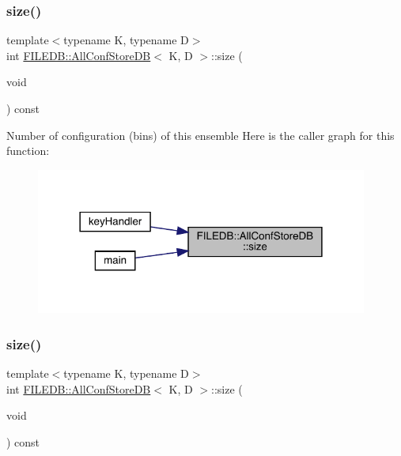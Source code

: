 \subsubsection{\texorpdfstring{size()}{size()}\hspace{0.1cm}{\footnotesize\ttfamily [1/2]}}
{\footnotesize\ttfamily template$<$typename K, typename D$>$ \\
int \mbox{\hyperlink{classFILEDB_1_1AllConfStoreDB}{F\+I\+L\+E\+D\+B\+::\+All\+Conf\+Store\+DB}}$<$ K, D $>$\+::size (\begin{DoxyParamCaption}\item[{void}]{ }\end{DoxyParamCaption}) const\hspace{0.3cm}{\ttfamily [inline]}}

Number of configuration (bins) of this ensemble Here is the caller graph for this function\+:\nopagebreak
\begin{figure}[H]
\begin{center}
\leavevmode
\includegraphics[width=309pt]{df/db6/classFILEDB_1_1AllConfStoreDB_a78dd830c5211b3b00b8eae6170ffc9d6_icgraph}
\end{center}
\end{figure}
\mbox{\label{classFILEDB_1_1AllConfStoreDB_a78dd830c5211b3b00b8eae6170ffc9d6}} 
\subsubsection{\texorpdfstring{size()}{size()}\hspace{0.1cm}{\footnotesize\ttfamily [2/2]}}
{\footnotesize\ttfamily template$<$typename K, typename D$>$ \\
int \mbox{\hyperlink{classFILEDB_1_1AllConfStoreDB}{F\+I\+L\+E\+D\+B\+::\+All\+Conf\+Store\+DB}}$<$ K, D $>$\+::size (\begin{DoxyParamCaption}\item[{void}]{ }\end{DoxyParamCaption}) const\hspace{0.3cm}{\ttfamily [inline]}}

